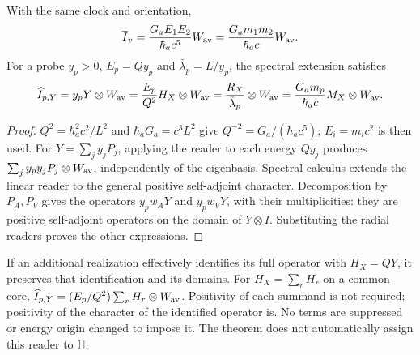 \begin{theorem}
\label{hmtcuatro:gea:autoinercial-radial} With the same clock and orientation,
\begin{equation}
\overline I_v=\frac{G_aE_1E_2}{\hbar_ac^5}W_{\rm av}
=\frac{G_am_1m_2}{\hbar_ac}W_{\rm av}.
\label{hmtcuatro:gea:mach-gravedad}
\end{equation}
For a probe $y_p>0$, $E_p=Qy_p$ and $\bar\lambda_p=L/y_p$, the spectral extension satisfies
\begin{equation}
\widehat I_{p,Y}=y_pY\otimes W_{\rm av}
=\frac{E_p}{Q^2}H_X\otimes W_{\rm av}
=\frac{R_X}{\bar\lambda_p}\otimes W_{\rm av}
=\frac{G_am_p}{\hbar_ac}M_X\otimes W_{\rm av}.
\label{hmtcuatro:gea:identidad-autoinercial}
\end{equation}
\end{theorem}
\begin{proof}
$Q^2=\hbar_a^2c^2/L^2$ and $\hbar_aG_a=c^3L^2$ give $Q^{-2}=G_a/(\hbar_ac^5)$; $E_i=m_ic^2$ is then used. For $Y=\sum_jy_jP_j$, applying the reader to each energy $Qy_j$ produces $\sum_jy_py_jP_j\otimes W_{\rm av}$, independently of the eigenbasis. Spectral calculus extends the linear reader to the general positive self-adjoint character. Decomposition by $P_A,P_V$ gives the operators $y_pw_AY$ and $y_pw_VY$, with their multiplicities: they are positive self-adjoint operators on the domain of $Y\otimes I$. Substituting the radial readers proves the other expressions.
\end{proof}

If an additional realization effectively identifies its full operator with $H_X=QY$, it preserves that identification and its domains. For $H_X=\sum_rH_r$ on a common core, $\widehat I_{p,Y}=(E_p/Q^2)\sum_rH_r\otimes W_{\rm av}$. Positivity of each summand is not required; positivity of the character of the identified operator is. No terms are suppressed or energy origin changed to impose it. The theorem does not automatically assign this reader to $\mathbb H$.

